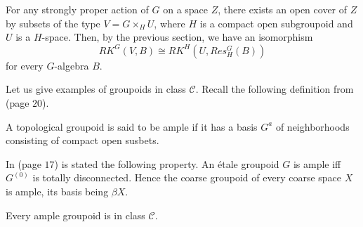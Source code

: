\begin{rk}
For any strongly proper action of $G$ on a space $Z$, there exists an open cover of $Z$ by subsets of the type $V=G\times_H U$, where $H$ is a compact open subgroupoid and $U$ is a $H$-space. Then, by the previous section, we have an isomorphism
\[RK^G(V,B)\cong RK^H(U, Res_H^G (B))\]
for every $G$-algebra $B$. 
\end{rk}

Let us give examples of groupoids in class $\mathcal C$. Recall the following definition from \cite{Renault} (page $20$).

\begin{definition}
A topological groupoid is said to be ample if it has a basis $G^a$ of neighborhoods consisting of compact open susbets.
\end{definition}

In \cite{paterson} (page $17$) is stated the following property. An étale groupoid $G$ is ample iff $G^{(0)}$ is totally disconnected. Hence the coarse groupoid of every coarse space $X$ is ample, its basis being $\beta X$.

\begin{prop}
Every ample groupoid is in class $\mathcal C$.
\end{prop}


